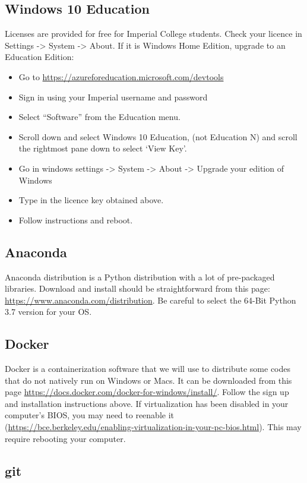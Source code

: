 \documentclass[11pt]{article}
\begin{document}
\subsection{Windows 10 Education}

Licenses are provided for free for Imperial College students. Check your licence in Settings -> System -> About. If it is Windows Home Edition, upgrade to an Education Edition:
\begin{itemize}
  \item Go to \url{https://azureforeducation.microsoft.com/devtools}
  \item Sign in using your Imperial username and password
  \item Select ``Software'' from the Education menu.
  \item Scroll down and select Windows 10 Education, (not Education N) and scroll the rightmost pane down to select `View Key'. 
  \item Go in windows settings -> System -> About -> Upgrade your edition of Windows
  \item Type in the licence key obtained above.
  \item Follow instructions and reboot.
\end{itemize}

\subsection{Anaconda}

Anaconda distribution is a Python distribution with a lot of pre-packaged libraries. 
Download and install should be straightforward from this page: \url{https://www.anaconda.com/distribution}. 
Be careful to select the 64-Bit Python 3.7 version for your OS.

\subsection{Docker}

Docker is a containerization software that we will use to distribute some codes that do not natively run on Windows or Macs. 
It can be downloaded from this page \url{https://docs.docker.com/docker-for-windows/install/}. 
Follow the sign up and installation instructions above. If virtualization has been disabled in your computer's BIOS, you may need to reenable it (\url{https://bce.berkeley.edu/enabling-virtualization-in-your-pc-bios.html}). This may require rebooting your computer.

\subsection{git}
\end{document}
